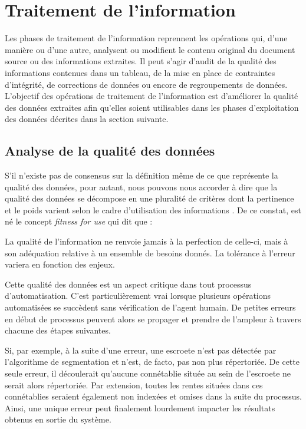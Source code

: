 \section{Traitement de l'information}
Les phases de traitement de l'information reprennent les opérations qui, d'une manière ou d'une autre, analysent ou modifient le contenu original du document source ou des informations extraites. Il peut s'agir d'audit de la qualité des informations contenues dans un tableau, de la mise en place de contraintes d'intégrité, de corrections de données ou encore de regroupements de données. 
L'objectif des opérations de traitement de l'information est d'améliorer la qualité des données extraites afin qu'elles soient utilisables dans les phases d'exploitation des données décrites dans la section suivante.

\subsection{Analyse de la qualité des données}
S'il n'existe pas de consensus sur la définition même de ce que représente la qualité des données, pour autant, nous pouvons nous accorder à dire que la qualité des données se décompose en une pluralité de critères dont la pertinence et le poids varient selon le cadre d'utilisation des informations \parencite{berti-equille_qualite_2004}. De ce constat, est né le concept \textit{fitness for use} qui dit que :
\begin{displayquote}
    \og La qualité de l'information ne renvoie jamais à la perfection de celle-ci, mais à son adéquation relative à un ensemble de besoins donnés. La tolérance à l'erreur variera en fonction des enjeux.\fg{} 
\end{displayquote} 
\vspace{0,5cm}

Cette qualité des données est un aspect critique dans tout processus d'automatisation. C'est particulièrement vrai lorsque plusieurs opérations automatisées se succèdent sans vérification de l'agent humain. De petites erreurs en début de processus peuvent alors se propager et prendre de l'ampleur à travers chacune des étapes suivantes. 

Si, par exemple, à la suite d'une erreur, une escroete n'est pas détectée par l'algorithme de segmentation et n'est, de facto,  pas non plus répertoriée. De cette seule erreur, il découlerait qu'aucune connétablie située au sein de l'escroete ne serait alors répertoriée. Par extension, toutes les rentes situées dans ces connétablies seraient également non indexées et omises dans la suite du processus. Ainsi, une unique erreur peut finalement lourdement impacter les résultats obtenus en sortie du système.

